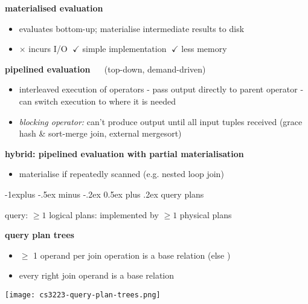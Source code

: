 \documentclass[10pt, landscape]{article}
\makeatletter
\renewcommand{\subsection}{\@startsection{subsection}{2}{0mm}%
  {-1explus -.5ex minus -.2ex}%
  {0.5ex plus .2ex}%
{\normalfont\normalsize\bfseries}}
\makeatother
\begin{document}
\begin{multicols*}{4}
  \textbf{materialised evaluation}

  \begin{itemize}
    \item evaluates bottom-up; materialise intermediate results to disk
    \item $\times$ incurs I/O  $\;\checkmark$ simple implementation $\;\checkmark$ less memory
  \end{itemize}

  \textbf{pipelined evaluation} $\quad$ (top-down, demand-driven)

  \begin{itemize}
    \item interleaved execution of operators - pass output directly to parent operator - can switch execution to where it is needed
    \item \textit{blocking operator:} can't produce output until all input tuples received (grace hash \& sort-merge join, external mergesort)
  \end{itemize}

  \textbf{hybrid: pipelined evaluation with partial materialisation}

  \begin{itemize}
    \item materialise if repeatedly scanned (e.g. nested loop join)
  \end{itemize}

  \subsection{query plans}

  query: $\geq 1$ logical plans: implemented by $\geq 1$ physical plans

  \textbf{query plan trees}

  \begin{minipage}[c]{0.6\linewidth}\color{black}
    \begin{itemize}
      \item {} $\geq$ 1 operand per join operation is a base relation
            (else )
      \item {} every right join operand is a base relation
    \end{itemize}
  \end{minipage}
  \begin{minipage}[c]{0.36\linewidth}
    \texttt{[image: cs3223-query-plan-trees.png]}
  \end{minipage}


\end{multicols*}
\end{document}
